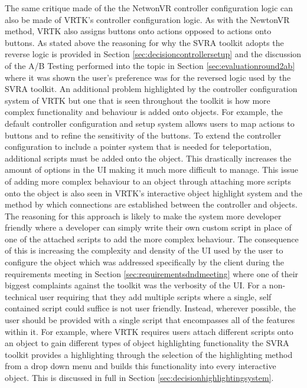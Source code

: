 \documentclass{l4proj}
\begin{document}
The same critique made of the the NetwonVR controller configuration logic can also be made of VRTK's controller configuration logic. As with the NewtonVR method, VRTK also assigns buttons onto actions opposed to actions onto buttons. As stated above the reasoning for why the SVRA toolkit adopts the reverse logic is provided in Section \ref{sec:decisioncontrollersetup} and the discussion of the A/B Testing performed into the topic in Section \ref{sec:evaluationround2ab} where it was shown the user's preference was for the reversed logic used by the SVRA toolkit. An additional problem highlighted by the controller configuration system of VRTK but one that is seen throughout the toolkit is how more complex functionality and behaviour is added onto objects. For example, the default controller configuration and setup system allows users to map actions to buttons and to refine the sensitivity of the buttons. To extend the controller configuration to include a pointer system that is needed for teleportation, additional scripts must be added onto the object. This drastically increases the amount of options in the UI making it much more difficult to manage. This issue of adding more complex behaviour to an object through  attaching more scripts onto the object is also seen in VRTK's interactive object highlight system and the method by which connections are established between the controller and objects. The reasoning for this approach is likely to make the system more developer friendly where a developer can simply write their own custom script in place of one of the attached scripts to add the more complex behaviour. The consequence of this is increasing the complexity and density of the UI used by the user to configure the object which was addressed specifically by the client during the requirements meeting in Section \ref{sec:requirementsdndmeeting} where one of their biggest complaints against the toolkit was the verbosity of the UI. For a non-technical user requiring that they add multiple scripts where a single, self contained script could suffice is not user friendly. Instead, wherever possible, the user should be provided with a single script that encompasses all of the features within it. For example, where VRTK requires users attach different scripts onto an object to gain different types of object highlighting functionality the SVRA toolkit provides a highlighting through the selection of the highlighting method from a drop down menu and builds this functionality into every interactive object. This is discussed in full in Section \ref{sec:decisionhighlightingsystem}.
\end{document}
